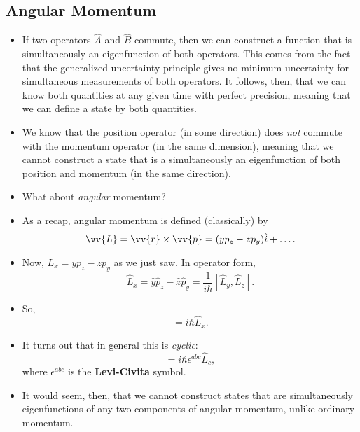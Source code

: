 \subsection*{Angular Momentum}

\begin{itemize}
    \item If two operators $\hat{A}$ and $\hat{B}$ commute, then we can construct a function that is simultaneously an eigenfunction of both operators. This comes from the fact that the generalized uncertainty principle gives no minimum uncertainty for simultaneous measurements of both operators. It follows, then, that we can know both quantities at any given time with perfect precision, meaning that we can define a state by both quantities.
    \item We know that the position operator (in some direction) does \textit{not} commute with the momentum operator (in the same dimension), meaning that we cannot construct a state that is a simultaneously an eigenfunction of both position and momentum (in the same direction).
    \item What about \textit{angular} momentum?
    \item As a recap, angular momentum is defined (classically) by 
        \begin{equation}
            \vv{L} = \vv{r}\times\vv{p} = (yp_z - zp_y)\hat{i} + \ldots.
        \end{equation}
    \item Now, $L_x = yp_z - zp_y$ as we just saw. In operator form,
        \begin{equation}
            \hat{L}_x = \hat{y}\hat{p}_z - \hat{z}\hat{p}_y = \frac{1}{i\hbar}[\hat{L}_y,\hat{L}_z].
        \end{equation}
    \item So,
        \begin{equation}
            [\hat{L}_y,\hat{L}_z] = i\hbar \hat{L}_x.
        \end{equation}
    \item It turns out that in general this is \textit{cyclic}:
        \begin{equation}
            [\hat{L}_a,\hat{L}_b] = i\hbar \epsilon^{abc} \hat{L}_c,
        \end{equation}
        where $\epsilon^{abc}$ is the \textbf{Levi-Civita} symbol.
    \item It would seem, then, that we cannot construct states that are simultaneously eigenfunctions of any two components of angular momentum, unlike ordinary momentum.

\end{itemize}
